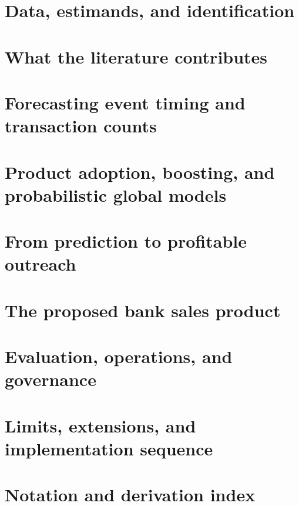 \documentclass[11pt,oneside]{article}
\begin{document}
\section{Data, estimands, and identification}


\section{What the literature contributes}


\section{Forecasting event timing and transaction counts}


\section{Product adoption, boosting, and probabilistic global models}


\section{From prediction to profitable outreach}


\section{The proposed bank sales product}


\section{Evaluation, operations, and governance}


\section{Limits, extensions, and implementation sequence}


\clearpage
\appendix
\section{Notation and derivation index}


\clearpage
\begingroup
\raggedright
{}


\endgroup
\end{document}
